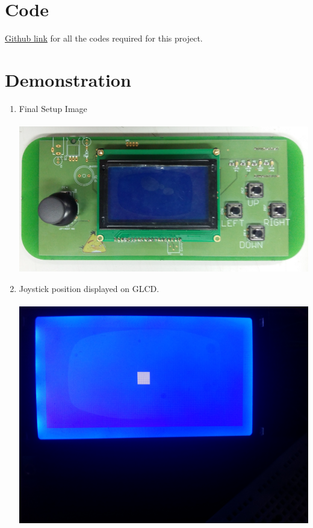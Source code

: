 \documentclass[a4paper,12pt,oneside]{book}
\begin{document}
\section{Code}
\href{https://github.com/eYSIP-2016/eYSIP-2016-Around-the-world-of-Embedded-Systems/tree/origin/master/Solutions/development\%20board}{Github link} for all the codes required for this project.


\section{Demonstration}
\begin{enumerate}
\item Final Setup Image\\~\\
\includegraphics[scale=0.5]{abc.PNG}
\newpage
\item Joystick position displayed on GLCD.\\~\\
\includegraphics[scale=0.07]{20160708_113016.jpg}

\end{enumerate}
\end{document}
